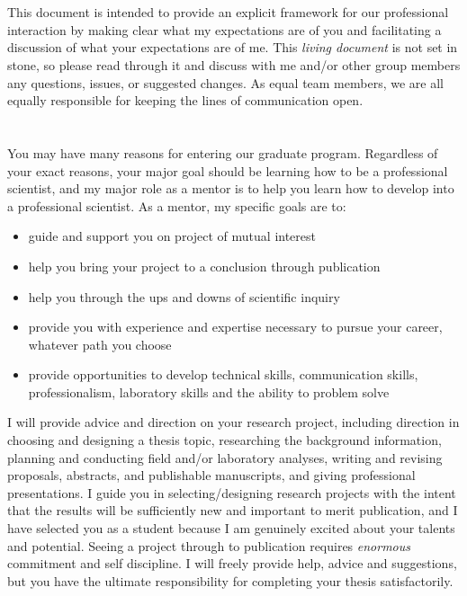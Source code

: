 \documentclass[11pt]{article}
\newcommand{\p}[1]{\vspace{1em} \noindent{\textbf{\textsc{#1~~}}}}
\begin{document}
\section*{} %
\vspace{-2em}
\p{Summary} This document is intended to provide an explicit framework for our professional interaction by making clear what my expectations are of you and facilitating a discussion of what your expectations are of me. This \emph{living document} is not set in stone, so please read through it and discuss with me and/or other group members any questions, issues, or suggested changes. As equal team members, we are all equally responsible for keeping the lines of communication open.

\section*{} %
\vspace{-4em}
\p{Goals} You may have many reasons for entering our graduate program. Regardless of your exact reasons, your major goal should be learning how to be a professional scientist, and my major role as a mentor is to help you learn how to develop into a professional scientist. As a mentor, my specific goals are to:
\begin{itemize}
	\itemsep0em
	\item guide and support you on project of mutual interest
	\item help you bring your project to a conclusion through publication
	\item help you through the ups and downs of scientific inquiry
	\item provide you with experience and expertise necessary to pursue your career, whatever path you choose
	\item provide opportunities to develop technical skills, communication skills, professionalism, laboratory skills and the ability to problem solve
\end{itemize}
I will provide advice and direction on your research project, including direction in choosing and designing a thesis topic, researching the background information, planning and conducting field and/or laboratory analyses, writing and revising proposals, abstracts, and publishable manuscripts, and giving professional presentations.
I guide you in selecting/designing research projects with the intent that the results will be sufficiently new and important to merit publication, and I have selected you as a student because I am genuinely excited about your talents and potential.
Seeing a project through to publication requires \emph{enormous} commitment and self discipline.
I will freely provide help, advice and suggestions, but you have the ultimate responsibility for completing your thesis satisfactorily.
\end{document}
